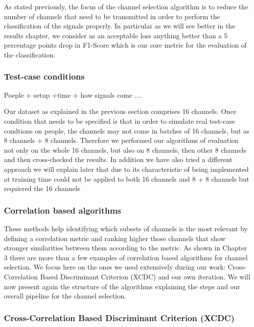 \documentclass{Configuration_Files/PoliMi3i_thesis}
\begin{document}
As stated previously, the focus of the channel selection algorithm is to reduce the number of channels that need to be transmitted in order to perform the classification of the signals properly.
In particular as we will see better in the results chapter, we consider as an acceptable loss anything better than a 5 percentage points drop in F1-Score which is our core metric for the evaluation of the classification.

\subsubsection{Test-case conditions}

Poeple + setup +time + how signals come ....

Our dataset as explained in the previous section comprises 16 channels.
Once condition that needs to be specified is that in order to simulate real test-case condtions on people, the channels may not come in batches of 16 channels, but as 8 channels + 8 channels.
Therefore we performed our algorithms of evaluation not only on the whole 16 channels, but also on 8 channels, then other 8 channels and then cross-checked the results.
In addition we have also tried a different approach we will explain later that due to its characteristic of being implemented at training time could not be applied to both 16 channels and 8 + 8 channels but requiered the 16 channels

\subsubsection{Correlation based algorithms}

These methods help identifying which subsets of channels is the most relevant by defining a correlation metric and ranking higher those channels that show stronger similarities between them according to the metric.
As shown in Chapter 3 there are more than a few examples of correlation based algorithms for channel selection.
We focus here on the ones we used extensively during our work: Cross-Correlation Based Discriminant Criterion (XCDC) and our own iteration.
We will now present again the structure of the algorithms explaining the steps and our overall pipeline for the channel selection.

\subsubsection{Cross-Correlation Based Discriminant
Criterion (XCDC)}
\end{document}
